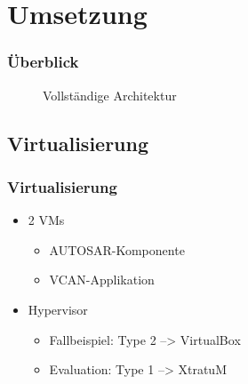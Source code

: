 \documentclass[]{beamer}
\newcommand{\inputImage}[1]{}
\begin{document}







\section{Umsetzung}
\label{sec:umsetzung}

\begin{frame}
\frametitle{Überblick}
    \begin{figure}[ht]
        \centering
        \resizebox{0.8\linewidth}{!}{\inputImage{arch_finished.dia}}
        \caption{Vollständige Architektur}
        \label{fig:arch_finished}
    \end{figure}
\end{frame}




\subsection{Virtualisierung}
\begin{frame}
\frametitle{Virtualisierung}
    \begin{itemize}
        \item 2 VMs
        \begin{itemize}
            \item AUTOSAR-Komponente
            \item VCAN-Applikation
        \end{itemize}
        \item Hypervisor
        \begin{itemize}
            \item Fallbeispiel: Type 2 --> VirtualBox
            \item Evaluation: Type 1 --> XtratuM
        \end{itemize}
    \end{itemize}
\end{frame}
\end{document}
